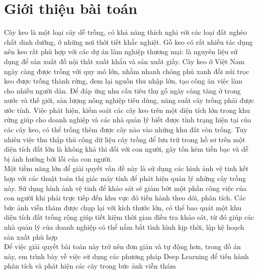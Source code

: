 \documentclass[a4paper, 12pt]{report}
\begin{document}
\section{Giới thiệu bài toán}
\hspace*{1cm} Cây keo là một loại cây dễ trồng, có khả năng thích nghi với các loại đất nghèo chất dinh dưỡng, ở những nơi thời tiết khắc nghiệt. Gỗ keo có rất nhiều tác dụng nên keo rất phù hợp với các dự án lâm nghiệp thương mại: là nguyên liệu sử dụng để sản xuất đồ nội thất xuất khẩu và sản xuất giấy. Cây keo ở Việt Nam ngày càng được trồng với quy mô lớn, nhằm nhanh chóng phủ xanh đồi núi trọc keo được trồng thành rừng, đem lại nguồn thu nhập lớn, tạo công ăn việc làm cho nhiều người dân. Để đáp ứng nhu cầu tiêu thụ gỗ ngày càng tăng ở trong nước và thế giới, sản lượng nông nghiệp tiêu dùng, năng suất cây trồng phải được ước tính. Việc phát hiện, kiểm soát các cây keo trên một diện tích lớn trong khu rừng giúp cho doanh nghiệp và các nhà quản lý biết được tình trạng hiện tại của các cây keo, có thể trồng thêm được cây nào vào những khu đất còn trống. Tuy nhiên việc thu thập thủ công dữ liệu cây trồng để lưu trữ trong hồ sơ trên một diện tích đất lớn là không khả thi đối với con người, gây tốn kém tiền bạc và dễ bị ảnh hưởng bởi lỗi của con người. \\
\hspace*{1cm} Một tiềm năng lớn để giải quyết vấn đề này là sử dụng các hình ảnh vệ tinh kết hợp với các thuật toán thị giác máy tính để phát hiện quản lý những cây trồng này. Sử dụng hình ảnh vệ tinh để khảo sát sẽ giảm bớt một phần công việc của con người khi phải trực tiếp đến khu vực đó tiến hành theo dõi, phân tích. Các bức ảnh viễn thãm được chụp lại với kích thước lớn, có thể bao quát một khu diện tích đất trồng rộng giúp tiết kiệm thời gian điều tra khảo sát, từ đó giúp các nhà quản lý của doanh nghiệp có thể nắm bắt tình hình kịp thời, lập kệ hoạch sản xuất phù hợp \\
\hspace*{1cm}Để việc giải quyết bài toán này trở nên đơn giản và tự động hơn, trong đồ án này, em trình bày về việc sử dụng các phương pháp Deep Learning để tiến hành phân tích và phát hiện các cây trong bức ảnh viễn thám
\end{document}
